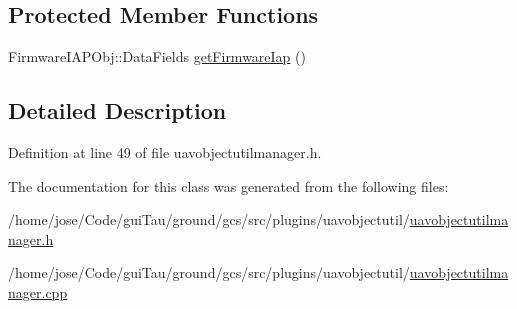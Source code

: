 \subsection*{Protected Member Functions}
\begin{DoxyCompactItemize}
\item 
Firmware\-I\-A\-P\-Obj\-::\-Data\-Fields \hyperlink{group___u_a_v_object_util_plugin_gabd93ae6b2c3ecb8444184c8aaf2176bb}{get\-Firmware\-Iap} ()
\end{DoxyCompactItemize}


\subsection{Detailed Description}


Definition at line 49 of file uavobjectutilmanager.\-h.



The documentation for this class was generated from the following files\-:\begin{DoxyCompactItemize}
\item 
/home/jose/\-Code/gui\-Tau/ground/gcs/src/plugins/uavobjectutil/\hyperlink{uavobjectutilmanager_8h}{uavobjectutilmanager.\-h}\item 
/home/jose/\-Code/gui\-Tau/ground/gcs/src/plugins/uavobjectutil/\hyperlink{uavobjectutilmanager_8cpp}{uavobjectutilmanager.\-cpp}\end{DoxyCompactItemize}
